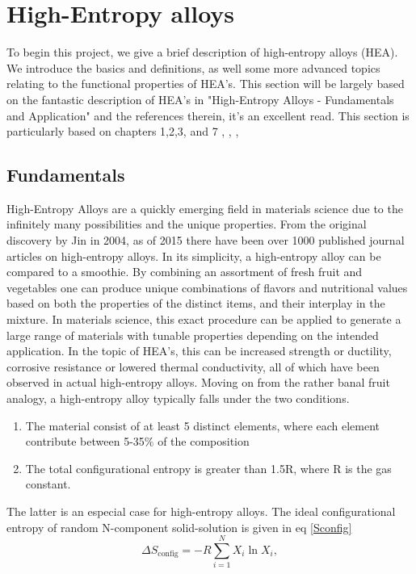 \chapter{High-Entropy alloys}
\label{sec:HEA}

To begin this project, we give a brief description of high-entropy alloys (HEA). We introduce the basics and definitions, as well some more advanced topics relating to the functional properties of HEA's. This section will be largely based on the fantastic description of HEA's in "High-Entropy Alloys - Fundamentals and Application" and the references therein, it's an excellent read. This section is particularly based on chapters 1,2,3, and 7 \cite{hea2016_ch1}, \cite{hea2016_ch2}, \cite{hea2016_ch3}, \cite{hea2016_ch7} 

\section{Fundamentals}
High-Entropy Alloys are a quickly emerging field in materials science due to the infinitely many possibilities and the unique properties. From the original discovery by Jin in 2004, as of 2015 there have been over 1000 published journal articles on high-entropy alloys. 
In its simplicity, a high-entropy alloy can be compared to a smoothie. By combining an assortment of fresh fruit and vegetables one can produce unique combinations of flavors and nutritional values based on both the properties of the distinct items, and their interplay in the mixture. In materials science, this exact procedure can be applied to generate a large range of materials with tunable properties depending on the intended application. In the topic of HEA's, this can be increased strength or ductility, corrosive resistance or lowered thermal conductivity, all of which have been observed in actual high-entropy alloys. 
Moving on from the rather banal fruit analogy, a high-entropy alloy typically falls under the two conditions.
\begin{enumerate}
    \item The material consist of at least 5 distinct elements, where each element contribute between 5-35$\%$ of the composition
    \item The total configurational entropy is greater than 1.5R, where R is the gas constant. 
\end{enumerate}
The latter is an especial case for high-entropy alloys. The ideal configurational entropy of random N-component solid-solution is given in eq \ref{Sconfig}
\begin{equation}
\Delta S_{\text{config}} = -R \sum_{i=1}^{N}X_i\ln X_i, \label{Sconfig}
\end{equation}
